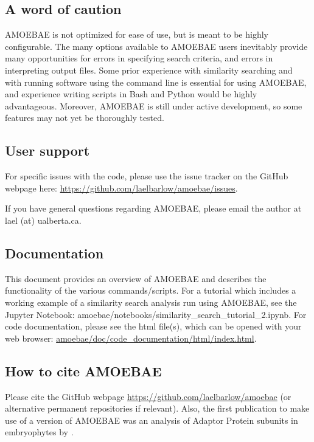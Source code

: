 \documentclass[12pt,letterpaper]{article}
\begin{document}
\begin{linenumbers}
\subsection{A word of caution}

AMOEBAE is not optimized for ease of use, but is meant to be highly
configurable. The many options available to AMOEBAE users inevitably provide
many opportunities for errors in specifying search criteria, and errors in
interpreting output files.  Some prior experience with similarity searching and
with running software using the command line is essential for using AMOEBAE,
and experience writing scripts in Bash and Python would be highly advantageous. 
Moreover, AMOEBAE is still under active development, so some features may not
yet be thoroughly tested.


\subsection{User support}

For specific issues with the code, please use the issue tracker on the GitHub
    webpage here: \url{https://github.com/laelbarlow/amoebae/issues}. 

If you have general questions regarding AMOEBAE, please email the author at
    lael (at) ualberta.ca.

\subsection{Documentation}

This document provides an overview of AMOEBAE and describes the functionality
of the various commands/scripts. For a tutorial which includes a working
example of a similarity search analysis run using AMOEBAE, see the Jupyter
Notebook: amoebae/notebooks/similarity\_search\_tutorial\_2.ipynb. For code
documentation, please see the html file(s), which can be opened with your web
browser: \url{amoebae/doc/code_documentation/html/index.html}.


\subsection{How to cite AMOEBAE}

Please cite the GitHub webpage \url{https://github.com/laelbarlow/amoebae} (or
alternative permanent repositories if relevant). Also, the first publication to
make use of a version of AMOEBAE was an analysis of Adaptor Protein subunits in
embryophytes by \cite{larson2019}.


\end{linenumbers}
\end{document}
